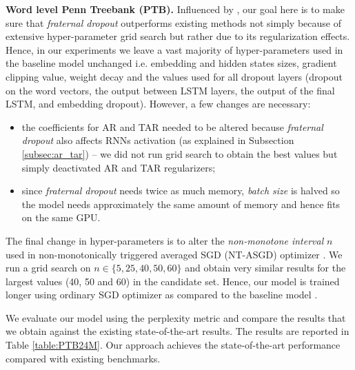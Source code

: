 \documentclass{article} \usepackage{iclr2018_conference,times}
\begin{document}
\textbf{Word level Penn Treebank (PTB).} Influenced by \cite{melis2017state}, our goal here is to make sure that \emph{fraternal dropout} outperforms existing methods not simply because of extensive hyper-parameter grid search but rather due to its regularization effects. Hence, in our experiments we leave a vast majority of hyper-parameters used in the baseline model \citep{melis2017state} unchanged i.e. embedding and hidden states sizes, gradient clipping value, weight decay and the values used for all dropout layers (dropout on the word vectors, the output between LSTM layers, the output of the final LSTM, and embedding dropout). However, a few changes are necessary:
\begin{itemize}
\item the coefficients for AR and TAR needed to be altered because \emph{fraternal dropout} also affects RNNs activation (as explained in Subsection \ref{subsec:ar_tar}) -- we did not run grid search to obtain the best values but simply deactivated AR and TAR regularizers;
\item since \emph{fraternal dropout} needs twice as much memory, \textit{batch size} is halved so the model needs approximately the same amount of memory and hence fits on the same GPU.
\end{itemize}
The final change in hyper-parameters is to alter the \emph{non-monotone interval} $n$ used in non-monotonically triggered averaged SGD (NT-ASGD) optimizer \cite{polyak1992acceleration, mandt2017stochastic,melis2017state}. We run a grid search on $n \in \{5, 25, 40, 50, 60\}$ and obtain very similar results for the largest values (40, 50 and 60) in the candidate set. Hence, our model is trained longer using ordinary SGD optimizer as compared to the baseline model \citep{melis2017state}.

We evaluate our model using the perplexity metric and compare the results that we obtain against the existing state-of-the-art results. The results are reported in Table \ref{table:PTB24M}. Our approach achieves the state-of-the-art performance compared with existing benchmarks.
\end{document}
